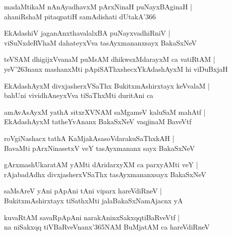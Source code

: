\begin{shloka}
madaMtikaM nAnAyadhavxM pArxNinaH puNayxBAginaH |\\
ahaniRshaM pitaqpatiH samAdishati dUtakA\char'366
\end{shloka}

\begin{shloka}
EkAdashiV jaganAnxthavalalxBA puNayxvadhiRniV |\\
viSuNxdeRVhaM dahateyxVva tasAyxmananxsayx BakaSxNeV
\end{shloka}

\begin{shloka}
teVSAM dhigijxVvanaM puMsAM dhikwsxMdarayxM ca vatiRtAM |\\
yeV\char'263nanx mashanxMti pApiSAThxshecxYkAdashAyxM hi viDuBxjaH
\end{shloka}

\begin{shloka}
EkAdashAyxM divxjasherxVSaThx BukitxmAshirxtayx keVvalaM |\\
bahUni vividhAneyxVva tiSaThxMti duritAni ca 
\end{shloka}

\begin{shloka}
amAvAsAyxM yathA sitxrXVNAM saMgameV kaluSaM mahAtf |\\
EkAdashAyxM tatheYvAnanx BakaSxNeV vaqjinaM BaveVtf
\end{shloka}

\begin{shloka}
roVgiNashacx tathA KaMjakAsasoVdarakuSaThxkAH |\\
BavaMti pArxNinasetxV veY tasAyxmananx sayx BakaSxNeV
\end{shloka}

\begin{shloka}
gArxmashUkaratAM yAMti dAridarxyXM ca parxyAMti veY |\\
rAjabadAdhx divxjasherxVSaThx tasAyxmananxsayx BakaSxNeV
\end{shloka}

\begin{shloka}
saMsAreV yAni pApAni tAni viparx hareVdiRneV |\\
BukitxmAshirxtayx tiSathxMti jalaBakaSxNamAjacnx yA
\end{shloka}

\begin{shloka}
kuvaRtAM savaRpApAni narakAninxSakxqqtiBaRveVtf |\\
na niSakxqq tiVBaRveVnanx\char'365NAM BuMjatAM ca hareVdiRneV 
\end{shloka}

